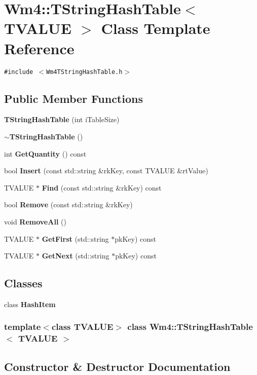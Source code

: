 \section{Wm4::TString\-Hash\-Table$<$ TVALUE $>$ Class Template Reference}
\label{classWm4_1_1TStringHashTable}
{\tt \#include $<$Wm4TString\-Hash\-Table.h$>$}

\subsection*{Public Member Functions}
\begin{CompactItemize}
\item 
{\bf TString\-Hash\-Table} (int i\-Table\-Size)
\item 
{\bf $\sim$TString\-Hash\-Table} ()
\item 
int {\bf Get\-Quantity} () const
\item 
bool {\bf Insert} (const std::string \&rk\-Key, const TVALUE \&rt\-Value)
\item 
TVALUE $\ast$ {\bf Find} (const std::string \&rk\-Key) const
\item 
bool {\bf Remove} (const std::string \&rk\-Key)
\item 
void {\bf Remove\-All} ()
\item 
TVALUE $\ast$ {\bf Get\-First} (std::string $\ast$pk\-Key) const
\item 
TVALUE $\ast$ {\bf Get\-Next} (std::string $\ast$pk\-Key) const
\end{CompactItemize}
\subsection*{Classes}
\begin{CompactItemize}
\item 
class \textbf{Hash\-Item}
\end{CompactItemize}
\subsubsection*{template$<$class TVALUE$>$ class Wm4::TString\-Hash\-Table$<$ TVALUE $>$}



\subsection{Constructor \& Destructor Documentation}
